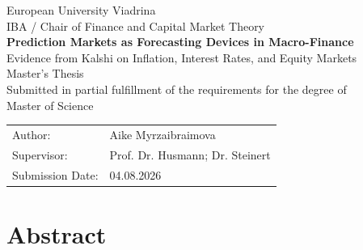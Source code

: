 \documentclass[12pt,a4paper]{report}
\begin{document}


\begin{titlepage}

\begin{center}

{\Large European University Viadrina}\\[1cm]

{\large IBA / Chair of Finance and Capital Market Theory}\\[2cm]

{\Huge \textbf{Prediction Markets as Forecasting Devices in Macro-Finance}}\\[0.5cm]

{\Large Evidence from Kalshi on Inflation, Interest Rates, and Equity Markets}\\[2cm]

Master's Thesis\\[0.5cm]

Submitted in partial fulfillment of the requirements for the degree of\\
Master of Science\\[2cm]

\begin{tabular}{ll}
Author: & Aike Myrzaibraimova \\
Supervisor: & Prof. Dr. Husmann; Dr. Steinert \\
Submission Date: & 04.08.2026 \\
\end{tabular}

\vfill

\end{center}

\end{titlepage}

\setcounter{page}{2}
\thispagestyle{empty}
\null
\newpage

\setcounter{page}{1}

\chapter*{Abstract}
\end{document}
